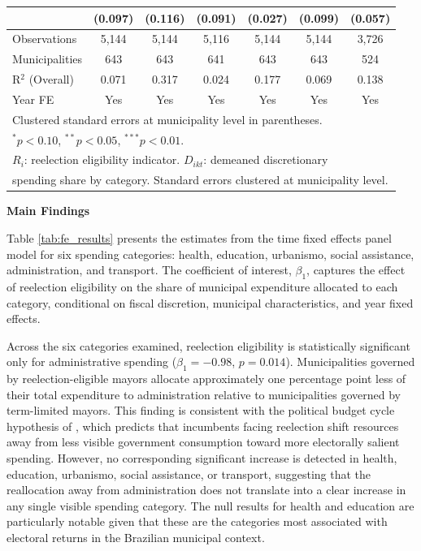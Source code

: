 \documentclass[12pt, a4paper]{article}
\begin{document}
\begin{table}[htbp]
{\begin{tabular}{lcccccc}
 & (0.097) & (0.116) & (0.091) & (0.027) & (0.099) & (0.057) \\
\hline
Observations & 5,144 & 5,144 & 5,116 & 5,144 & 5,144 & 3,726 \\
Municipalities & 643 & 643 & 641 & 643 & 643 & 524 \\
R$^2$ (Overall) & 0.071 & 0.317 & 0.024 & 0.177 & 0.069 & 0.138 \\
Year FE & Yes & Yes & Yes & Yes & Yes & Yes \\
\hline\hline
\multicolumn{7}{l}{\footnotesize Clustered standard errors at municipality level in parentheses.} \\
\multicolumn{7}{l}{\footnotesize $^{*}p<0.10$, $^{**}p<0.05$, $^{***}p<0.01$.} \\
\multicolumn{7}{l}{\footnotesize $R_i$: reelection eligibility indicator. $D_{ikt}$: demeaned discretionary} \\
\multicolumn{7}{l}{\footnotesize spending share by category. Standard errors clustered at municipality level.} \\
\end{tabular}%
}
\end{table}

\textbf{{\large Main Findings}}

Table \ref{tab:fe_results} presents the estimates from the time fixed effects panel model for six spending categories: health, education, urbanismo, social assistance, administration, and transport. The coefficient of interest, $\beta_1$, captures the effect of reelection eligibility on the share of municipal expenditure allocated to each category, conditional on fiscal discretion, municipal characteristics, and year fixed effects.

Across the six categories examined, reelection eligibility is statistically significant only for administrative spending ($\beta_1 = -0.98$, $p = 0.014$). Municipalities governed by reelection-eligible mayors allocate approximately one percentage point less of their total expenditure to administration relative to municipalities governed by term-limited mayors. This finding is consistent with the political budget cycle hypothesis of \cite{rogoff:1990}, which predicts that incumbents facing reelection shift resources away from less visible government consumption toward more electorally salient spending. However, no corresponding significant increase is detected in health, education, urbanismo, social assistance, or transport, suggesting that the reallocation away from administration does not translate into a clear increase in any single visible spending category. The null results for health and education are particularly notable given that these are the categories most associated with electoral returns in the Brazilian municipal context.
\end{document}
